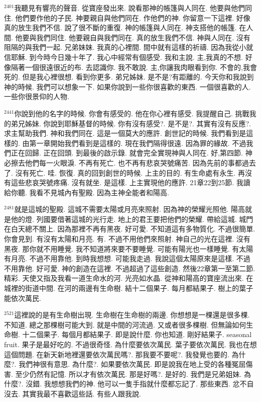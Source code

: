 \documentclass{book}
\begin{document}
$^{2401}$我聽見有響亮的聲音.
從寶座發出來.
說看那神的帳篷與人同在.
他要與他們同住.
他們要作他的子民.
神要親自與他們同在.
作他們的神.
你留意一下這裡.
好像真的放生我們不信.
說了很不斷的重復.
神的帳篷與人同在.
神支搭他的帳篷.
在人間.
他要與我們同住.
他要親自與我們同在.
真的放生我們不信.
神與人同在.
沒有阻隔的與我們一起.
兄弟妹妹.
我真的心裡間.
間中就有這樣的祈禱.
因為我從小就信耶穌.
到今時今日幾十年了.
我心中經常有個感受.
我和主說.
主,我真的不想.
好像隔著一個很遠很近的布.
去認識你.
我不敢說.
主,你讓我肉眼看到你.
不會的,我會死的.
但是我心裡很想.
看到你更多.
弟兄姊妹.
是不是?有距離的.
今天你和我說到神的時候.
我們可以想象一下.
如果你說到一些你很喜歡的東西.
一個很喜歡的人.
一些你很景仰的人物.

$^{2441}$你說到他的名字的時候.
你會有感受的.
他在你心裡有感受.
我提醒自己.
挑戰我的弟兄姊妹.
你說到耶穌基督的時候.
你有沒有感受?.
是不是?.
其實有沒有反應?.
求主幫助我們.
神和我們同在.
這是一個莫大的應許.
創世記的時候.
我們看到是這樣的.
由第一章開始我們看到是這樣的.
現在我們隔得很遠.
因為罪的緣故.
不過我們正在回歸.
正在回頭.
到最後的啟示錄.
就會完全實現神與人同在.
好,第四節.
神必擦去他們每一火眼淚.
不再有死亡.
也不再有悲哀哭號痛苦.
因為先前的事都過去了.
沒有死亡.
哇.
恢復.
真的回到創世的時候.
上主的目的.
有生命處有永生.
再沒有這些悲哀哭號疼痛.
沒有就坐.
是這樣.
上主實現他的應許.
21章22到25節.
我讀給你聽.
我看不見城內有聖殿.
因為主神全能者和陽高.

$^{2481}$就是這城的聖殿.
這城不需要太陽或月亮來照射.
因為神的榮耀光照他.
陽高就是他的燈.
列國要借著這城的光行走.
地上的君王要把他們的榮耀.
帶給這城.
城門在白天總不關上.
因為那裡不再有黑夜.
好可愛.
不知道這有多物質化.
不過很簡單.
你會見到.
有沒有太陽和月亮.
有.
不過不用他們來照射.
神自己的光在這裡.
沒有黑夜.
那你就不用睡覺.
我不知道將來要不要睡覺.
可能有陽光也一樣睡覺.
有太陽有月亮.
不過不用靠他.
到時我想想.
可能我走過.
我說這個太陽原來是這樣.
不過不用靠他.
好可愛.
神的創造在這裡.
不過超過了這些創造.
然後22章第一至第二節.
精彩.
天使又指及我看一道生命水的河.
光亮如水晶.
從神和陽高的寶座流出來.
在城裡的街道中間.
在河的兩邊有生命樹.
結十二個果子.
每月都結果子.
樹上的葉子能依次萬民.

$^{2521}$這裡說的是有生命樹出現.
生命樹在生命樹的兩邊.
你想想是一棵還是很多棵.
不知道.
總之那棵樹可能大到.
就是中間的河流過.
又或者很多棵樹.
但無論如何生命樹.
十二個果子.
每個月都結果子.
即是說什麼.
你也知道.
剛好結果子.
seasonal fruit.
果子是最好吃的.
不過很奇怪.
為什麼要依次萬民.
葉子要依次萬民.
我也在想這個問題.
在新天新地裡還要依次萬民嗎?.
那我要不要呢?.
我發覺也要的.
為什麼?.
我們神很有意思.
為什麼?.
如果要依次萬民.
即是說我在地上受的各種冤屈傷害.
至少仍然有記憶.
所以才有依次萬民.
那是好嗎?.
是好的.
我們是兄弟姐妹.
為什麼?.
沒錯.
我想想我們的神.
他可以一隻手指就什麼都忘記了.
那些東西.
忿不自沒去.
其實我最不喜歡這些話.
有些人跟我說.
\end{document}
